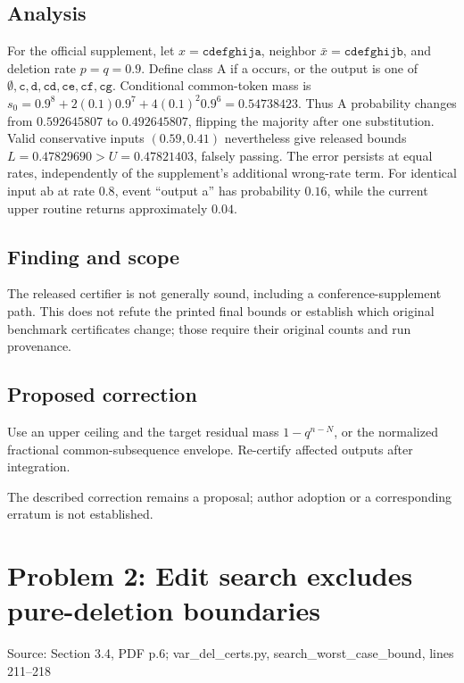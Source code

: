 \documentclass[11pt]{article}
\begin{document}
\subsection*{Analysis}

For the official supplement, let \(x=\texttt{cdefghija}\), neighbor \(\bar x=\texttt{cdefghijb}\), and deletion rate \(p=q=0.9\). Define class A if a occurs, or the output is one of \(\emptyset,\texttt{c},\texttt{d},\texttt{cd},\texttt{ce},\texttt{cf},\texttt{cg}\). Conditional common-token mass is \(s_0=0.9^8+2(0.1)0.9^7+4(0.1)^2 0.9^6=0.54738423\). Thus A probability changes from \(0.592645807\) to \(0.492645807\), flipping the majority after one substitution. Valid conservative inputs \((0.59,0.41)\) nevertheless give released bounds \(L=0.47829690>U=0.47821403\), falsely passing. The error persists at equal rates, independently of the supplement’s additional wrong-rate term. For identical input ab at rate \(0.8\), event “output a” has probability \(0.16\), while the current upper routine returns approximately \(0.04\).

\subsection*{Finding and scope}

The released certifier is not generally sound, including a conference-supplement path. This does not refute the printed final bounds or establish which original benchmark certificates change; those require their original counts and run provenance.

\subsection*{Proposed correction}

Use an upper ceiling and the target residual mass \(1-q^{n-N}\), or the normalized fractional common-subsequence envelope. Re-certify affected outputs after integration.

The described correction remains a proposal; author adoption or a corresponding erratum is not established.

\section*{Problem 2: Edit search excludes pure-deletion boundaries}

Source: Section 3.4, PDF p.6; var\_del\_certs.py, search\_worst\_case\_bound, lines 211–218
\end{document}
